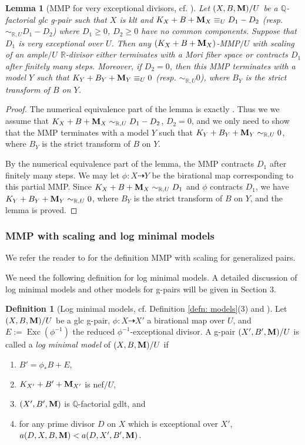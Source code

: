 \documentclass[11pt]{amsart}
\numberwithin{equation}{section}
\newcommand{\Mm}{{\bf{M}}}
\newcommand{\Qq}{\mathbb{Q}}
\newcommand{\Rr}{\mathbb{R}}
\newcommand{\Exc}{\operatorname{Exc}}
\newtheorem{lem}[thm]{Lemma}
\theoremstyle{definition}
\newtheorem{defn}[thm]{Definition}
\theoremstyle{definition}
\theoremstyle{definition}
\begin{document}
\begin{lem}[MMP for very exceptional divisors, {cf. \cite[Proposition 3.8]{HL18}}]\label{lem: rlinear version of hl18 3.8}
Let $(X,B,\Mm)/U$ be a $\Qq$-factorial glc g-pair such that $X$ is klt and $K_X+B+\Mm_X\equiv_{U}D_1-D_2$ (resp.  $\sim_{\mathbb R,U}D_1-D_2$) where $D_1\geq 0$, $D_2\geq 0$ have no common components. Suppose that $D_1$ is very exceptional over $U$. Then any $(K_X+B+\Mm_X)$-MMP$/U$ with scaling of an ample$/U$ $\Rr$-divisor either terminates with a Mori fiber space or contracts $D_1$ after finitely many steps. Moreover, if $D_2=0$, then this MMP terminates with a model $Y$ such that  $K_Y+B_Y+\Mm_Y\equiv_{U}0$ (resp. $\sim_{\mathbb R,U}0$), where $B_Y$ is the strict transform of $B$ on $Y$. 
\end{lem}
\begin{proof}
The numerical equivalence part of the lemma is exactly \cite[Proposition 3.8]{HL18}. Thus we we assume that $K_X+B+\Mm_X\sim_{\mathbb R,U}D_1-D_2$, $D_2=0$, and we only need to show that the MMP terminates with a model $Y$ such that $K_Y+B_Y+\Mm_Y\sim_{\mathbb R,U}0$, where $B_Y$ is the strict transform of $B$ on $Y$.

By the numerical equivalence part of the lemma, the MMP contracts $D_1$ after finitely many steps. We may let $\phi: X\dashrightarrow Y$ be the birational map corresponding to this partial MMP. Since $K_X+B+\Mm_X\sim_{\mathbb R,U}D_1$ and $\phi$ contracts $D_1$, we have $K_Y+B_Y+\Mm_Y\sim_{\mathbb R,U}0$, where $B_Y$ is the strict transform of $B$ on $Y$, and the lemma is proved.
\end{proof}

\subsubsection{MMP with scaling and log minimal models}

We refer the reader to \cite[Lemma 3.19, Definition 3.20]{HL18} for the definition  MMP with scaling for generalized pairs.

We need the following definition for log minimal models. A detailed discussion of log minimal models and other models for g-pairs will be given in Section 3.

\begin{defn}[Log minimal models, cf. Definition {\ref{defn: models}(3)} and {\cite[Definition 2.9]{HL18}}]
Let $(X,B,\Mm)/U$ be a glc g-pair, $\phi: X\dashrightarrow X'$ a birational map over $U$, and $E:=\Exc(\phi^{-1})$ the reduced $\phi^{-1}$-exceptional divisor. A g-pair $(X',B',\Mm)/U$ is called a \emph{log minimal model} of $(X,B,\Mm)/U$ if
\begin{enumerate}
    \item $B'=\phi_*B+E$,
    \item $K_{X'}+B'+\Mm_{X'}$ is nef$/U$,
    \item $(X',B',\Mm)$ is $\Qq$-factorial gdlt, and
    \item for any prime divisor $D$ on $X$ which is exceptional over $X'$, $a(D,X,B,\Mm)<a(D,X',B',\Mm)$.
\end{enumerate}
\end{defn}
\end{document}
